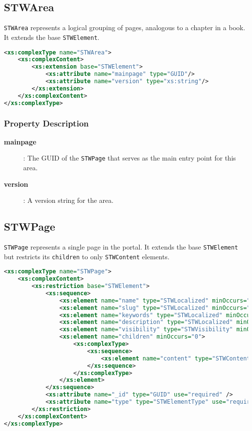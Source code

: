 \subsection{STWArea}

\texttt{STWArea} represents a logical grouping of pages, analogous to a chapter in a book. It extends the base \texttt{STWElement}.

\begin{lstlisting}[language=XML,caption={STWArea Type Definition}]
<xs:complexType name="STWArea">
    <xs:complexContent>
        <xs:extension base="STWElement">
            <xs:attribute name="mainpage" type="GUID"/>
            <xs:attribute name="version" type="xs:string"/>
        </xs:extension>
    </xs:complexContent>
</xs:complexType>
\end{lstlisting}

\subsubsection{Property Description}

\begin{description}
\item[\textbf{mainpage}]: The GUID of the \texttt{STWPage} that serves as the main entry point for this area.
\item[\textbf{version}]: A version string for the area.
\end{description}

\subsection{STWPage}

\texttt{STWPage} represents a single page in the portal. It extends the base \texttt{STWElement} but restricts its \texttt{children} to only \texttt{STWContent} elements.

\begin{lstlisting}[language=XML,caption={STWPage Type Definition}]
<xs:complexType name="STWPage">
    <xs:complexContent>
        <xs:restriction base="STWElement">
            <xs:sequence>
                <xs:element name="name" type="STWLocalized" minOccurs="1" />
                <xs:element name="slug" type="STWLocalized" minOccurs="1" />
                <xs:element name="keywords" type="STWLocalized" minOccurs="0" />
                <xs:element name="description" type="STWLocalized" minOccurs="0" />
                <xs:element name="visibility" type="STWVisibility" minOccurs="0" />
                <xs:element name="children" minOccurs="0">
                    <xs:complexType>
                        <xs:sequence>
                            <xs:element name="content" type="STWContent" minOccurs="0" maxOccurs="unbounded"/>
                        </xs:sequence>
                    </xs:complexType>
                </xs:element>
            </xs:sequence>
            <xs:attribute name="_id" type="GUID" use="required" />
            <xs:attribute name="type" type="STWElementType" use="required" />
        </xs:restriction>
    </xs:complexContent>
</xs:complexType>
\end{lstlisting}

